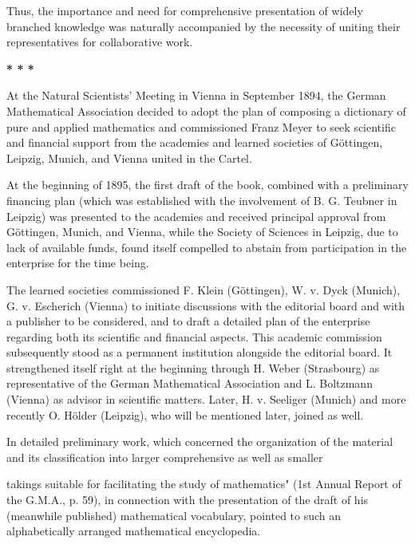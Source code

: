 \thispagestyle{fancy}

\vspace{0.5cm}

Thus, the importance and need for comprehensive presentation of widely branched knowledge was naturally accompanied by the necessity of uniting their representatives for collaborative work.

\vspace{0.5cm}

\centerline{\textbf{* * *}}

\vspace{0.5cm}

At the Natural Scientists' Meeting in Vienna in September 1894, the German Mathematical Association decided to adopt the plan of composing a dictionary of pure and applied mathematics and commissioned Franz Meyer to seek scientific and financial support from the academies and learned societies of Göttingen, Leipzig, Munich, and Vienna united in the Cartel.

At the beginning of 1895, the first draft of the book, combined with a preliminary financing plan (which was established with the involvement of B. G. Teubner in Leipzig) was presented to the academies and received principal approval from Göttingen, Munich, and Vienna, while the Society of Sciences in Leipzig, due to lack of available funds, found itself compelled to abstain from participation in the enterprise for the time being.

The learned societies commissioned F. Klein (Göttingen), W. v. Dyck (Munich), G. v. Escherich (Vienna) to initiate discussions with the editorial board and with a publisher to be considered, and to draft a detailed plan of the enterprise regarding both its scientific and financial aspects. This academic commission subsequently stood as a permanent institution alongside the editorial board. It strengthened itself right at the beginning through H. Weber (Strasbourg) as representative of the German Mathematical Association and L. Boltzmann (Vienna) as advisor in scientific matters. Later, H. v. Seeliger (Munich) and more recently O. Hölder (Leipzig), who will be mentioned later, joined as well.

In detailed preliminary work, which concerned the organization of the material and its classification into larger comprehensive as well as smaller

\vfill
\leftline{\rule{2in}{0.4pt}}
\vspace{0.2cm}
{\footnotesize takings suitable for facilitating the study of mathematics" (1st Annual Report of the G.M.A., p. 59), in connection with the presentation of the draft of his (meanwhile published) mathematical vocabulary, pointed to such an alphabetically arranged mathematical encyclopedia.}
